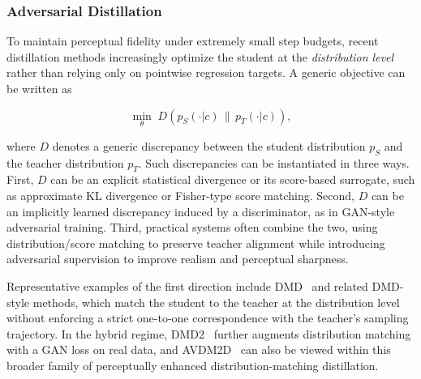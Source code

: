 \documentclass[lettersize,journal]{IEEEtran}
\begin{document}

\subsubsection{Adversarial Distillation}

To maintain perceptual fidelity under extremely small step budgets, recent distillation methods increasingly optimize the student at the \emph{distribution level} rather than relying only on pointwise regression targets. A generic objective can be written as

\begin{equation}
\min_\theta \; D\!\left(p_S(\cdot|c)\,\|\,p_T(\cdot|c)\right),
\label{eq:dmd_generic}
\end{equation}

where $D$ denotes a generic discrepancy between the student distribution $p_S$ and the teacher distribution $p_T$. Such discrepancies can be instantiated in three ways. First, $D$ can be an explicit statistical divergence or its score-based surrogate, such as approximate KL divergence or Fisher-type score matching. Second, $D$ can be an implicitly learned discrepancy induced by a discriminator, as in GAN-style adversarial training. Third, practical systems often combine the two, using distribution/score matching to preserve teacher alignment while introducing adversarial supervision to improve realism and perceptual sharpness.

Representative examples of the first direction include DMD~\cite{yin2024one} and related DMD-style methods, which match the student to the teacher at the distribution level without enforcing a strict one-to-one correspondence with the teacher's sampling trajectory. In the hybrid regime, DMD2~\cite{yin2024improved} further augments distribution matching with a GAN loss on real data, and AVDM2D~\cite{zhu2024accelerating} can also be viewed within this broader family of perceptually enhanced distribution-matching distillation.
\end{document}
